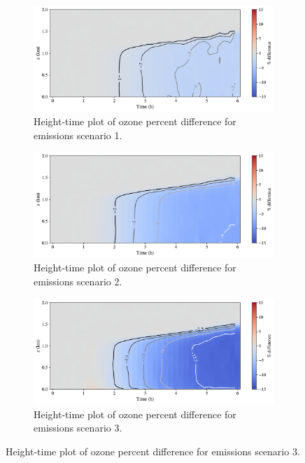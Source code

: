 \begin{figure}[h]
  \centering
  \begin{subfigure}
    \centering
    \includegraphics[width=.8\textwidth]{figures/chapter4/height-time-pdiff-o3-fx1fy0.pdf}
    \caption{Height-time plot of ozone percent difference for emissions scenario 1.}
  \end{subfigure}
     \vspace*{5mm} 
  \begin{subfigure}
    \centering
    \includegraphics[width=.8\textwidth]{figures/chapter4/height-time-pdiff-o3-road-10x.pdf}
    \caption{Height-time plot of ozone percent difference for emissions scenario 2.}
  \end{subfigure}
   \vspace*{5mm} 
  \begin{subfigure}
    \centering
    \includegraphics[width=.8\textwidth]{figures/chapter4/height-time-pdiff-o3-point-source-1x1.pdf}
    \caption{Height-time plot of ozone percent difference for emissions scenario 3.}
  \end{subfigure}
\end{figure}

